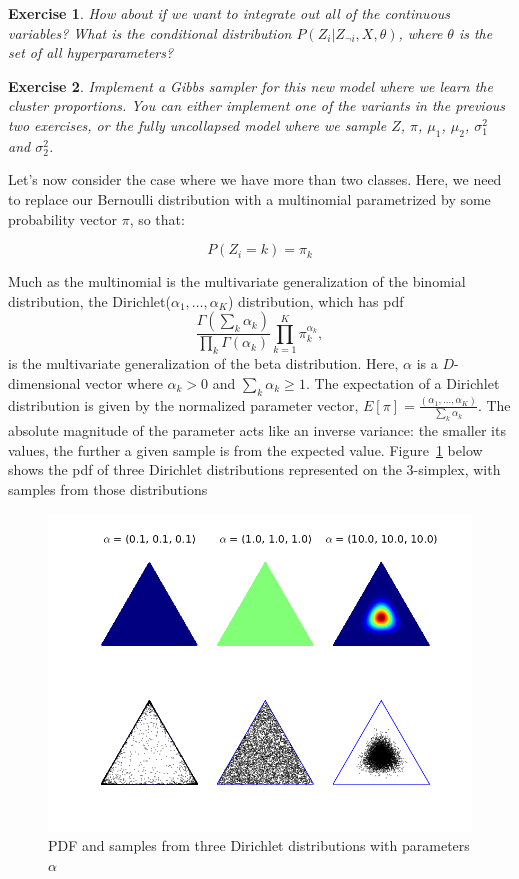 \documentclass[twoside]{article}
\newcounter{lecnum}
\newtheorem{exercise}{Exercise}[lecnum]
\begin{document}
\begin{exercise}
  How about if we want to integrate out all of the continuous variables? What is the conditional distribution $P(Z_i|Z_{\neg i}, X, \theta)$, where $\theta$ is the set of all hyperparameters?
\end{exercise}

\begin{exercise}
  Implement a Gibbs sampler for this new model where we learn the cluster proportions. You can either implement one of the variants in the previous two exercises, or the fully uncollapsed model where we sample $Z$, $\pi$, $\mu_1$, $\mu_2$, $\sigma^2_1$ and $\sigma^2_2$.
\end{exercise}


Let's now consider the case where we have more than two classes. Here, we need to replace our Bernoulli distribution with a multinomial parametrized by some probability vector $\pi$, so that:

$$P(Z_i = k) = \pi_k$$


  Much as the multinomial is the multivariate generalization of the binomial distribution, the Dirichlet($\alpha_1,\dots,\alpha_K$) distribution, which has pdf
  $$\frac{\Gamma(\sum_k \alpha_k)}{\prod_k \Gamma(\alpha_k)} \prod_{k=1}^K \pi_k^{\alpha_k},$$
  is the multivariate generalization of the beta distribution. Here, $\alpha$ is a $D$-dimensional vector where $\alpha_k>0$ and $\sum_k\alpha_k\geq 1$. The expectation of a Dirichlet distribution is given by the normalized parameter vector, $E[\pi] = \frac{(\alpha_1,\dots,\alpha_K)}{\sum_k\alpha_k}$. The absolute magnitude of the parameter acts like an inverse variance: the smaller its values, the further a given sample is from the expected value. Figure~\ref{fig:DirSimp} below shows the pdf of three Dirichlet distributions represented on the 3-simplex, with samples from those distributions
  \begin{figure}
    \begin{center}
      \includegraphics[width=.7\textwidth]{dirichlet-simplex}
      \caption{PDF and samples from three Dirichlet distributions with parameters $\alpha$}
      \label{fig:DirSimp}
    \end{center}
  \end{figure}
\end{document}
